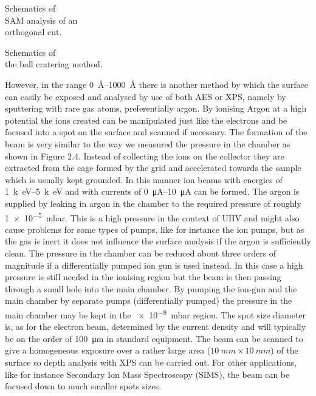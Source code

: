   Schematics of\\ SAM analysis of
 an\\ orthogonal cut.\\

 \vspace{6cm}

  Schematics of \\ the ball
 cratering method.\\

 \vspace{6cm}

However, in the range \SIrange{0}{1000}{\angstrom} there is another method by which the surface can easily be exposed and analysed by use of both AES or XPS, namely by sputtering with rare gas atoms, preferentially argon. By ionising Argon at a high potential the ions created can be manipulated just like the electrons and be focused into a spot on the surface and scanned if necessary. The formation of the beam is very similar to the way we measured the pressure in the chamber as shown in Figure 2.4. Instead of collecting the ions on the collector they are extracted from the cage formed by the grid and accelerated towards the sample which is usually kept grounded. In this manner ion beams with energies of \SIrange{1}{5}{k\electronvolt} and with currents of \SIrange{0}{10}{\micro A} can be formed. The argon is supplied by leaking in argon in the chamber to the required pressure of roughly \SI{1e-5}{mbar}. This is a high pressure in the context of UHV and might also cause problems for some types of pumps, like for instance the ion pumps, but as the gas is inert it does not influence the surface analysis if the argon is sufficiently clean. The pressure in the chamber can be reduced about three orders of magnitude if a differentially pumped ion gun is used instead. In this case a high pressure is still needed in the ionising region but the beam is then passing through a small hole into the main chamber. By pumping the ion-gun and the main chamber by separate pumps (differentially pumped) the pressure in the main chamber may be kept in the \SI{e-8}{mbar} region. The spot size diameter is, as for the electron beam, determined by the current density and will typically be on the order of \SI{100}{\micro m} in standard equipment. The beam can be scanned to give a homogeneous exposure over a rather large area ($\SI{10}{mm}\times\SI{10}{mm}$) of the surface so depth analysis with XPS can be carried out. For other applications, like for instance Secondary Ion Mass Spectroscopy (SIMS), the beam can be focused down to much smaller spots sizes.

